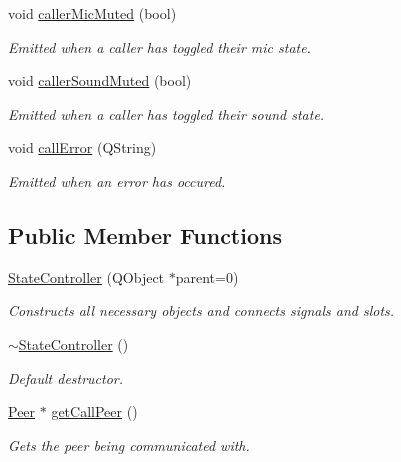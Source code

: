 \begin{DoxyCompactItemize}
void \hyperlink{class_state_controller_af46adae585d21730cf1b8b34a2231e5f}{caller\-Mic\-Muted} (bool)
\begin{DoxyCompactList}\small\item\em \-Emitted when a caller has toggled their mic state. \end{DoxyCompactList}\item 
void \hyperlink{class_state_controller_a00a1262e6c4c821bbdd04d11ea7c4910}{caller\-Sound\-Muted} (bool)
\begin{DoxyCompactList}\small\item\em \-Emitted when a caller has toggled their sound state. \end{DoxyCompactList}\item 
void \hyperlink{class_state_controller_a3e16a340c75fec465358fee52bf57ec0}{call\-Error} (\-Q\-String)
\begin{DoxyCompactList}\small\item\em \-Emitted when an error has occured. \end{DoxyCompactList}\end{DoxyCompactItemize}
\subsection*{\-Public \-Member \-Functions}
\begin{DoxyCompactItemize}
\item 
\hyperlink{class_state_controller_af999000cc08456efccb2423a9173143f}{\-State\-Controller} (\-Q\-Object $\ast$parent=0)
\begin{DoxyCompactList}\small\item\em \-Constructs all necessary objects and connects signals and slots. \end{DoxyCompactList}\item 
\hyperlink{class_state_controller_af28a57ede7f1276025bebbaf400468f9}{$\sim$\-State\-Controller} ()
\begin{DoxyCompactList}\small\item\em \-Default destructor. \end{DoxyCompactList}\item 
\hyperlink{class_peer}{\-Peer} $\ast$ \hyperlink{class_state_controller_adadae117f434bc21cce75fa7e3e4d728}{get\-Call\-Peer} ()
\begin{DoxyCompactList}\small\item\em \-Gets the peer being communicated with. \end{DoxyCompactList}\end{DoxyCompactItemize}
